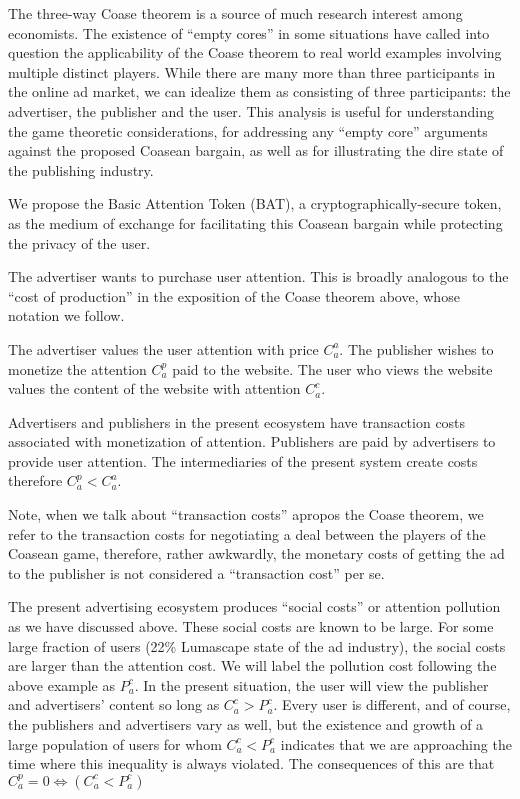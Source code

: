 \documentclass[11pt]{article}
\begin{document}
The three-way Coase theorem is a source of much research interest
among economists. The existence of ``empty cores'' in some situations
have called into question the applicability of the Coase theorem to
real world examples involving multiple distinct players\cite{20}. While there
are many more than three participants in the online ad market, we can
idealize them as consisting of three participants: the advertiser, the
publisher and the user. This analysis is useful for understanding the
game theoretic considerations, for addressing any ``empty core''
arguments against the proposed Coasean bargain, as well as for
illustrating the dire state of the publishing industry. 

We propose the Basic Attention Token (\textrm{BAT}), a cryptographically-secure
token, as the medium of exchange for facilitating this Coasean bargain
while protecting the privacy of the user.

The advertiser wants to purchase user attention. This is broadly
analogous to the ``cost of production'' in the exposition of the Coase
theorem above, whose notation we follow. 

The advertiser values the user attention with price $C^{a}_a$. The publisher wishes to 
monetize the attention $C^{p}_a$ paid to the website. The user who views the website 
values the content of the website with attention $C^{c}_a$.

Advertisers and publishers in the present ecosystem have transaction
costs associated with monetization of attention. Publishers are paid
by advertisers to provide user attention. The intermediaries of the
present system create costs therefore $C^{p}_a <  C^{a}_a$. 

Note, when we talk about ``transaction costs'' apropos the Coase
theorem, we refer to the transaction costs for negotiating a deal
between the players of the Coasean game, therefore, rather awkwardly,
the monetary costs of getting the ad to the publisher is not
considered a ``transaction cost'' per se.

The present advertising ecosystem produces ``social costs'' or attention
pollution as we have discussed above. These social costs are known to
be large. For some large fraction of users (22\% Lumascape state of the
ad industry), the social costs are larger than the attention cost. We
will label the pollution cost following the above example as
$P^{c}_a$. In the present situation, the user will view the
publisher and advertisers’ content so long as $C^{c}_a > P^{c}_a $. 
Every user is different, and of course, the publishers and advertisers
vary as well, but the existence and growth
of a large population of users for whom  $C^{c}_a < P^{c}_a $ indicates that we are
approaching the time where this inequality is always violated. The consequences of this are 
that $ C^{p}_a=0 \iff{(C^{c}_a < P^{c}_a)} $
\end{document}
